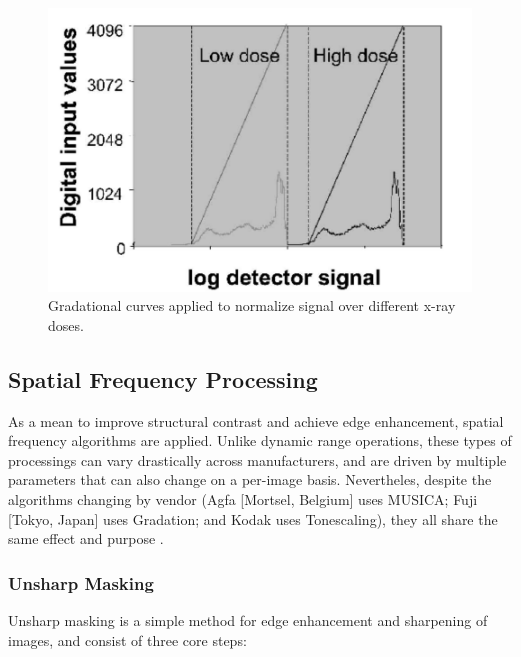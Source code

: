 \documentclass[nomenclature, english, bibtex]{kththesis}
\numberwithin{listing}{chapter}
\begin{document}
\begin{figure}[H]
    \centering
    \includegraphics[width=1.0\textwidth]{figures/LUT.png}
    \caption{Gradational curves applied to normalize signal over different x-ray doses.\cite[Figure~3]{Prokop2003}}
    \label{fig:histogram_stretching}
\end{figure}


\subsection{Spatial Frequency Processing}

As a mean to improve structural contrast and achieve edge enhancement, spatial frequency algorithms are applied.
Unlike dynamic range operations, these types of processings can vary drastically across manufacturers, and
are driven by multiple parameters that can also change on a per-image basis. Nevertheles, despite the algorithms
changing by vendor (Agfa [Mortsel, Belgium] uses MUSICA; Fuji [Tokyo, Japan] uses Gradation; and Kodak uses Tonescaling),
they all share the same effect and purpose \cite[p.~119]{carterDigitalRadiographyPACS2010}.

\subsubsection{Unsharp Masking}

Unsharp masking is a simple method for edge enhancement and sharpening of images, and consist of
three core steps:
\end{document}
